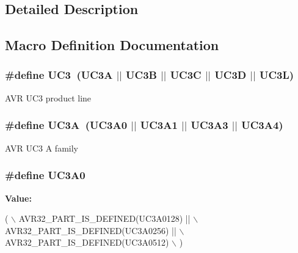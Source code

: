 \subsection{Detailed Description}


\subsection{Macro Definition Documentation}
\hypertarget{group__uc3__part__macros__group_ga848d950beec67bc702bfcfdecc70bb5b}{}
\subsubsection[{U\+C3}]{\setlength{\rightskip}{0pt plus 5cm}\#define U\+C3~({\bf U\+C3\+A} $\vert$$\vert$ {\bf U\+C3\+B} $\vert$$\vert$ {\bf U\+C3\+C} $\vert$$\vert$ {\bf U\+C3\+D} $\vert$$\vert$ {\bf U\+C3\+L})}\label{group__uc3__part__macros__group_ga848d950beec67bc702bfcfdecc70bb5b}
A\+V\+R U\+C3 product line \hypertarget{group__uc3__part__macros__group_gaf7f16cc2bde7daf34576983fee8824c8}{}
\subsubsection[{U\+C3\+A}]{\setlength{\rightskip}{0pt plus 5cm}\#define U\+C3\+A~(U\+C3\+A0 $\vert$$\vert$ U\+C3\+A1 $\vert$$\vert$ U\+C3\+A3 $\vert$$\vert$ U\+C3\+A4)}\label{group__uc3__part__macros__group_gaf7f16cc2bde7daf34576983fee8824c8}
A\+V\+R U\+C3 A family \hypertarget{group__uc3__part__macros__group_gaee4dd9ce50cc26707d159660db9fc408}{}
\subsubsection[{U\+C3\+A0}]{\setlength{\rightskip}{0pt plus 5cm}\#define U\+C3\+A0}\label{group__uc3__part__macros__group_gaee4dd9ce50cc26707d159660db9fc408}
{\bfseries Value\+:}
\begin{DoxyCode}
(   \(\backslash\)
        AVR32\_PART\_IS\_DEFINED(UC3A0128) || \(\backslash\)
        AVR32\_PART\_IS\_DEFINED(UC3A0256) || \(\backslash\)
        AVR32\_PART\_IS\_DEFINED(UC3A0512) \(\backslash\)
        )
\end{DoxyCode}
\hypertarget{group__uc3__part__macros__group_gacbe47eb7ac7d6e655d45657bffab3af6}{}
